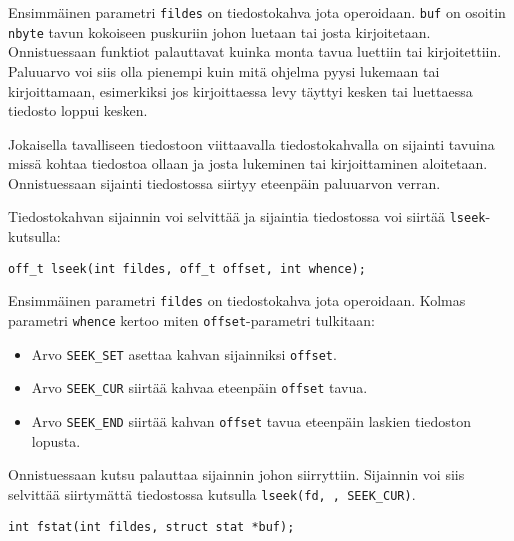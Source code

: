 Ensimmäinen parametri \texttt{fildes} on tiedostokahva jota operoidaan.
\texttt{buf} on osoitin \texttt{nbyte} tavun kokoiseen puskuriin johon
luetaan tai josta kirjoitetaan.
Onnistuessaan funktiot palauttavat kuinka monta tavua luettiin tai kirjoitettiin.
Paluuarvo voi siis olla pienempi kuin mitä ohjelma pyysi lukemaan tai kirjoittamaan,
esimerkiksi jos kirjoittaessa levy täyttyi kesken tai luettaessa
tiedosto loppui kesken.

Jokaisella tavalliseen tiedostoon viittaavalla tiedostokahvalla on
sijainti tavuina missä kohtaa tiedostoa ollaan ja josta
lukeminen tai kirjoittaminen aloitetaan.
Onnistuessaan sijainti tiedostossa siirtyy eteenpäin paluuarvon verran.

Tiedostokahvan sijainnin voi selvittää ja sijaintia tiedostossa voi
siirtää \texttt{lseek}-kutsulla:

\begin{verbatim}
off_t lseek(int fildes, off_t offset, int whence);
\end{verbatim}

Ensimmäinen parametri \texttt{fildes} on tiedostokahva jota operoidaan.
Kolmas parametri \texttt{whence} kertoo miten \texttt{offset}-parametri tulkitaan:

\begin{itemize}
    \item Arvo \texttt{SEEK\_SET} asettaa kahvan sijainniksi \texttt{offset}.
    \item Arvo \texttt{SEEK\_CUR} siirtää kahvaa eteenpäin \texttt{offset} tavua.
    \item Arvo \texttt{SEEK\_END} siirtää kahvan \texttt{offset} tavua eteenpäin laskien tiedoston lopusta.
\end{itemize}

Onnistuessaan kutsu palauttaa sijainnin johon siirryttiin.
Sijainnin voi siis selvittää siirtymättä tiedostossa kutsulla \texttt{lseek(fd, , SEEK\_CUR)}.

\begin{verbatim}
int fstat(int fildes, struct stat *buf);
\end{verbatim}

